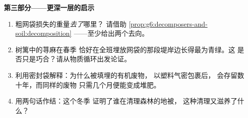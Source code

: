 \begin{problem}
\medskip\noindent\textbf{第三部分——更深一层的启示}
\begin{enumerate}[resume]
  \item 粗网袋损失的重量\emph{去了}哪里？
        请借助
        \cref{prop:g6:decomposers-and-soil:decomposition}
        ——至少给出两个去向。
  \item 树篱中的荨麻在春季
        恰好在全班埋放网袋的那段堤岸边长得最为青绿。这
        是否只是巧合？请从物质循环出发论证。
  \item 利用密封袋解释：为什么被填埋的有机废物，
        以塑料气密包裹后，
        会存留数十年，而同样的废物
        只需几个月便能变成堆肥。
  \item 用两句话作结：这个冬季
        证明了谁在清理森林的地被，
        这种清理又滋养了什么？
\end{enumerate}
\end{problem}
